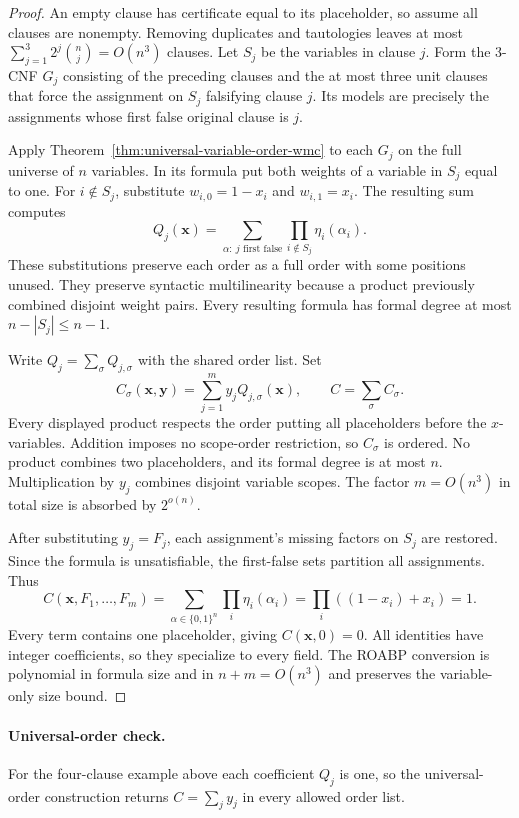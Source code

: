 \documentclass[11pt]{article}
\theoremstyle{definition}
\theoremstyle{remark}
\begin{document}
\begin{proof}
An empty clause has certificate equal to its placeholder, so assume
all clauses are nonempty. Removing duplicates and tautologies leaves
at most $\sum_{j=1}^3 2^j\binom nj=O(n^3)$ clauses. Let $S_j$
be the variables in clause $j$. Form the 3-CNF $G_j$ consisting of
the preceding clauses and the at most three unit clauses that force
the assignment on $S_j$ falsifying clause $j$. Its models are
precisely the assignments whose first false original clause is $j$.

Apply Theorem~\ref{thm:universal-variable-order-wmc} to each $G_j$
on the full universe of $n$ variables. In its formula put both
weights of a variable in $S_j$ equal to one. For $i\notin S_j$,
substitute $w_{i,0}=1-x_i$ and $w_{i,1}=x_i$. The resulting sum
computes
\[
 Q_j(\mathbf x)=
 \sum_{\alpha:\ j\text{ first false}}
             \prod_{i\notin S_j}\eta_i(\alpha_i).
\]
These substitutions preserve each order as a full order with some
positions unused. They preserve syntactic multilinearity because a
product previously combined disjoint weight pairs. Every resulting
formula has formal degree at most $n-|S_j|\le n-1$.

Write $Q_j=\sum_\sigma Q_{j,\sigma}$ with the shared order list.
Set
\[
 C_\sigma(\mathbf x,\mathbf y)=\sum_{j=1}^m
                 y_j Q_{j,\sigma}(\mathbf x),\qquad
 C=\sum_\sigma C_\sigma.
\]
Every displayed product respects the order putting all placeholders
before the $x$-variables. Addition imposes no scope-order restriction,
so $C_\sigma$ is ordered. No product combines two placeholders, and
its formal degree is at most $n$. Multiplication by $y_j$ combines
disjoint variable scopes. The factor $m=O(n^3)$ in total size is
absorbed by $2^{o(n)}$.

After substituting $y_j=F_j$, each assignment's missing factors on
$S_j$ are restored. Since the formula is unsatisfiable, the
first-false sets partition all assignments. Thus
\[
 C(\mathbf x,F_1,\ldots,F_m)
 =\sum_{\alpha\in\{0,1\}^n}\prod_i\eta_i(\alpha_i)
 =\prod_i((1-x_i)+x_i)=1.
\]
Every term contains one placeholder, giving $C(\mathbf x,0)=0$.
All identities have integer coefficients, so they specialize to
every field. The ROABP conversion is polynomial in formula size and
in $n+m=O(n^3)$ and preserves the variable-only size bound.
\end{proof}

\paragraph{Universal-order check.}
For the four-clause
example above each coefficient $Q_j$ is one, so the universal-order
construction returns $C=\sum_j y_j$ in every allowed order list.
\end{document}
